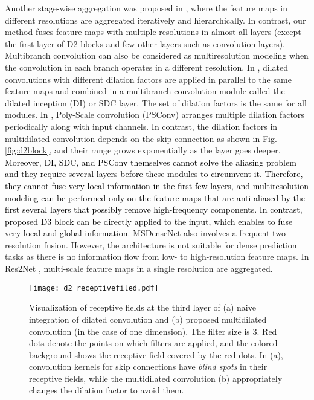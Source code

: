 \documentclass[final]{cvpr}
\def\NEW#1{\textcolor{black}{#1}}
\begin{document}
Another stage-wise aggregation was proposed in \cite{Yu18}, where the feature maps in different resolutions are aggregated iteratively and hierarchically.
In contrast, our method fuses feature maps with multiple resolutions in almost all layers (except the first layer of D2 blocks and few other layers such as  convolution layers).
Multibranch convolution can also be considered as multiresolution modeling when the convolution in each branch operates in a different resolution. In \cite{Shi2017DilatedInception,Chen2017DeepLab,Yang2020DilatedInception,Schuster19}, dilated convolutions with different dilation factors are applied in parallel to the same feature maps and combined in a multibranch convolution module called the dilated inception (DI) or SDC layer. The set of dilation factors is the same for all modules. 
In \cite{Li20PSConv}, Poly-Scale convolution (PSConv) arranges multiple dilation factors periodically along with input channels.
In contrast, the dilation factors in multidilated convolution depends on the skip connection as shown in Fig. \ref{fig:d2block}, and their range grows exponentially as the layer goes deeper.
\NEW{Moreover, DI, SDC, and PSConv themselves cannot solve the aliasing problem and they require several layers before these modules to circumvent it. Therefore, they cannot fuse very local information in the first few layers, and multiresolution modeling can be performed only on the feature maps that are anti-aliased by the first several layers that possibly remove high-frequency components. In contrast, proposed D3 block can be directly applied to the input, which enables to fuse very local and global information.
}
MSDenseNet \cite{Huang18MSDense} also involves a frequent two resolution fusion. However, the architecture is not suitable for dense prediction tasks as there is no information flow from low- to high-resolution feature maps.  In Res2Net \cite{Gao21Res2Net}, multi-scale feature maps in a single resolution are aggregated.

    

\begin{figure}[t]
  \centering
  \texttt{[image: d2\_receptivefiled.pdf]}
  \caption{Visualization of receptive fields at the third layer of (a) naive integration of dilated convolution and (b) proposed multidilated convolution (in the case of one dimension). The filter size is 3. Red dots denote the points on which filters are applied, and the colored background shows the receptive field covered by the red dots. In (a), convolution kernels for skip connections have \textit{blind spots} in their receptive fields, while the multidilated convolution (b) appropriately changes the dilation factor to avoid them.}
  \label{fig:d2rf}
\end{figure}
\end{document}
